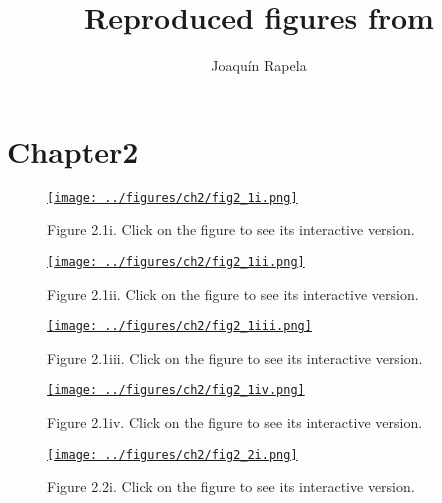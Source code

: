 \documentclass{article}
\title{Reproduced figures from \citet{durbinAndKoopman12}}
\author{Joaqu\'{i}n Rapela}
\begin{document}
\maketitle

\section{Chapter2}

\begin{figure}[h]
    \begin{center}
        \href{http://www.gatsby.ucl.ac.uk/~rapela/durbinAndKoopman12/figures/ch2/fig2_1i.html}{\texttt{[image: ../figures/ch2/fig2\_1i.png]}}
    \end{center}
    \caption{Figure 2.1i. Click on the figure to see its interactive version.}
\end{figure}

\begin{figure}[h]
    \begin{center}
        \href{http://www.gatsby.ucl.ac.uk/~rapela/durbinAndKoopman12/figures/ch2/fig2_1ii.html}{\texttt{[image: ../figures/ch2/fig2\_1ii.png]}}
    \end{center}
    \caption{Figure 2.1ii. Click on the figure to see its interactive version.}
\end{figure}

\begin{figure}[h]
    \begin{center}
        \href{http://www.gatsby.ucl.ac.uk/~rapela/durbinAndKoopman12/figures/ch2/fig2_1iii.html}{\texttt{[image: ../figures/ch2/fig2\_1iii.png]}}
    \end{center}
    \caption{Figure 2.1iii. Click on the figure to see its interactive version.}
\end{figure}

\begin{figure}[h]
    \begin{center}
        \href{http://www.gatsby.ucl.ac.uk/~rapela/durbinAndKoopman12/figures/ch2/fig2_1iv.html}{\texttt{[image: ../figures/ch2/fig2\_1iv.png]}}
    \end{center}
    \caption{Figure 2.1iv. Click on the figure to see its interactive version.}
\end{figure}

\begin{figure}[h]
    \begin{center}
        \href{http://www.gatsby.ucl.ac.uk/~rapela/durbinAndKoopman12/figures/ch2/fig2_2i.html}{\texttt{[image: ../figures/ch2/fig2\_2i.png]}}
    \end{center}
    \caption{Figure 2.2i. Click on the figure to see its interactive version.}
\end{figure}
\end{document}
